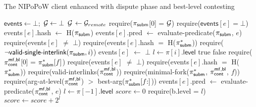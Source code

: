 \begin{algorithm}
    \caption{\label{alg:dispute-best-level}The \textsf{NIPoPoW} client enhanced
        with dispute phase and best-level contesting}

    \begin{algorithmic}[1]

    \State $\textsf{events} \gets \bot;$ $\mathcal{G} \gets \bot$
        \State $\mathcal{G}$ $\gets \mathcal{G}_{remote}$
    \EndFunction
        \State \textsf{require}($\mathsf{\pi_{subm}}$[0] = $\mathcal{G}$)
        \State \textsf{require}($\textsf{events$[e]$} = \bot$)
        \State \textsf{events$[e]$.hash} $\gets$ \textsf{H}($\mathsf{\pi_{subm}}$)
        \State \textsf{events$[e]$.pred} $\gets$
        \textsf{evaluate-predicate}(\textsf{$\mathsf{\pi_{subm}}$}, $e$)
    \EndFunction
        \State \textsf{require}(\textsf{events}$[e]$ $\ne$ $\bot$)
        \State \textsf{require}(\textsf{events$[e]$.hash} $=$ \textsf{H}($\mathsf{\pi_{subm}^*}$))
        \State \textsf{require}($\neg \textsf{valid-single-interlink}(\mathsf{\pi_{subm}}, i)$)
        \State \textsf{events$[e]$} $\gets$ $\bot$
    \EndFunction
        \State $l\gets\pi[i].\mathsf{level}$
        \State \Return true
        \EndIf
        \State \Return false
    \EndFunction
        \State \textsf{require}($\mathsf{\pi_{cont}^{mf, bl}}$[0] = $\mathsf{\pi_{subm}^*}[f]$)
        \State \textsf{require}(\textsf{events}$[e]$ $\ne$ $\bot$)
        \State \textsf{require}(\textsf{events$[e]$.hash} $=$ \textsf{H}($\mathsf{\pi_{subm}^*}$))
        \State \textsf{require}(\textsf{valid-interlinks}($\mathsf{\pi_{cont}^{mf, bl}}$))
        \State \textsf{require}(\textsf{minimal-fork}($\mathsf{\pi_{subm}^*}$,
        $\mathsf{\pi_{cont}^{mf, bl}}$, $f$))
        \State \textsf{require}(\textsf{arg-at-level}($\mathsf{\pi_{cont}^{mf, bl}}$)
        $>$ \textsf{best-arg}($\mathsf{\pi_{subm}^*}[f{:}]$))
        \State \textsf{events$[e]$.pred} $\gets$
            \textsf{evaluate-predicate}($\mathsf{\pi_{cont}^{mf, bl}}$, $e$)
    \EndFunction
        \State $l \gets \pi[-1].\textsf{level}$
        \State $score \gets 0$
            \State \textsf{require}(b.\textsf{level} = $l$)
            \State $score \gets score {+} 2^l$
        \EndFor
        \State {}
    \EndFunction
    \EndContract
    \vskip8pt
    \end{algorithmic}
\end{algorithm}

